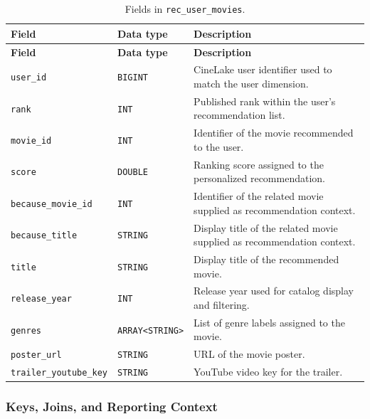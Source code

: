 \documentclass[a4paper,12pt]{article}
\newcommand{\dbsep}{\_\allowbreak}
\begin{document}
\begingroup
\small
\setlength{\tabcolsep}{4pt}
\renewcommand{\arraystretch}{1.1}
\begin{longtable}{@{}>{\raggedright\arraybackslash}p{}
                    >{\raggedright\arraybackslash}p{}
                    >{\raggedright\arraybackslash}p{}@{}}
\caption{Fields in \texttt{rec\dbsep user\dbsep movies}.}\\
\toprule
\textbf{Field} & \textbf{Data type} & \textbf{Description}\\
\midrule
\endfirsthead
\toprule
\textbf{Field} & \textbf{Data type} & \textbf{Description}\\
\midrule
\endhead
\bottomrule
\endfoot
\texttt{user\dbsep id} & \texttt{BIGINT} & CineLake user identifier used to match the user dimension.\\
\texttt{rank} & \texttt{INT} & Published rank within the user's recommendation list.\\
\texttt{movie\dbsep id} & \texttt{INT} & Identifier of the movie recommended to the user.\\
\texttt{score} & \texttt{DOUBLE} & Ranking score assigned to the personalized recommendation.\\
\texttt{because\dbsep movie\dbsep id} & \texttt{INT} & Identifier of the related movie supplied as recommendation context.\\
\texttt{because\dbsep title} & \texttt{STRING} & Display title of the related movie supplied as recommendation context.\\
\texttt{title} & \texttt{STRING} & Display title of the recommended movie.\\
\texttt{release\dbsep year} & \texttt{INT} & Release year used for catalog display and filtering.\\
\texttt{genres} & \texttt{ARRAY\allowbreak\textless{}STRING\textgreater{}} & List of genre labels assigned to the movie.\\
\texttt{poster\dbsep url} & \texttt{STRING} & URL of the movie poster.\\
\texttt{trailer\dbsep youtube\dbsep key} & \texttt{STRING} & YouTube video key for the trailer.\\
\end{longtable}
\endgroup

\subsubsection{Keys, Joins, and Reporting Context}
\label{sec:gold-provenance}
\end{document}
